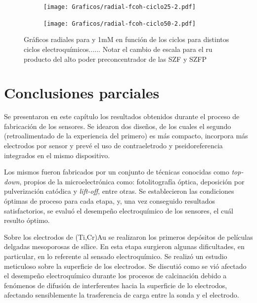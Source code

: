 \begin{figure}[t!]
\begin{subfigure}[t]{0.325\textwidth}
			     		\end{subfigure}
		     		\begin{subfigure}[t]{0.325\textwidth}
			        	\texttt{[image: Graficos/radial-fcoh-ciclo25-2.pdf]}
			     		\end{subfigure}
		     		\begin{subfigure}[t]{0.325\textwidth}
			        	\texttt{[image: Graficos/radial-fcoh-ciclo50-2.pdf]}
			     		\end{subfigure}	
			     	\caption{Gráficos radiales para \ru\space \fe\space y \fc\space 1mM en función de los ciclos para distintos ciclos electroquímicos...... Notar el cambio de escala para el ru producto del alto poder preconcentrador de las SZF y SZFP }
		     		\label{fig:radiales}
		      	   	\end{figure} 

					     
\section{Conclusiones parciales}

	Se presentaron en este capítulo los resultados obtenidos durante el proceso de fabricación de los sensores. Se idearon dos diseños, de los cuales el segundo (retroalimentado de la experiencia del primero) es más compacto, incorpora más electrodos por sensor y prevé el uso de contraeletrodo y pseidoreferencia integrados en el mismo dispositivo.
	
	Los mismos fueron fabricados por un conjunto de técnicas conocidas como \textit{top-down}, propios de la microelectrónica como: fotolitografía óptica, deposición por pulverización catódica y \textit{lift-off}, entre otras. Se establecieron las condiciones óptimas de proceso para cada etapa, y, una vez conseguido resultados satisfactorios, se evaluó el desempeño electroquímico de los sensores, el cuál resulto óptimo. 

	Sobre los electrodos de (Ti,Cr)\textbar Au se realizaron los primeros depósitos de películas delgadas mesoporosas de sílice. En esta etapa surgieron algunas dificultades, en particular, en lo referente al sensado electroquímico. Se realizó un estudio meticuloso sobre la superficie de los electrodos.  Se discutió como se vió afectado el desempeño electroquímico durante los procesos de calcinación debido a fenómenos de difusión de interferentes hacia la superficie de lo electrodos, afectando sensiblemente la trasferencia de carga entre la sonda y el electrodo. 

